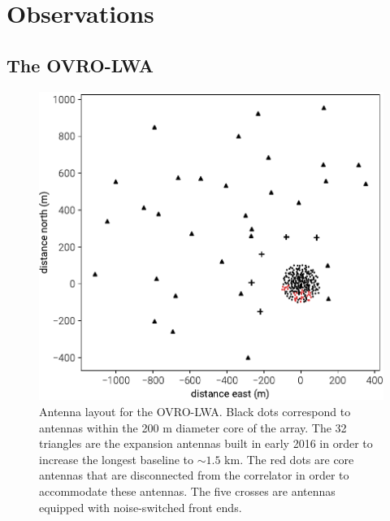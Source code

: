 \documentclass[twocolumn]{aastex61}
\begin{document}
\section{Observations}\label{sec:observations}

\subsection{The OVRO-LWA}

\begin{figure}[t]
    \includegraphics[width=\columnwidth]{figures/antenna-layout/antenna-layout}
    \caption{
        Antenna layout for the OVRO-LWA. Black dots correspond to antennas within the 200 m diameter
        core of the array. The 32 triangles are the expansion antennas built in early 2016 in order
        to increase the longest baseline to $\sim1.5$ km. The red dots are core antennas that are
        disconnected from the correlator in order to accommodate these antennas. The five crosses
        are antennas equipped with noise-switched front ends.
    }
    \label{fig:antenna-layout}
\end{figure}
\end{document}
